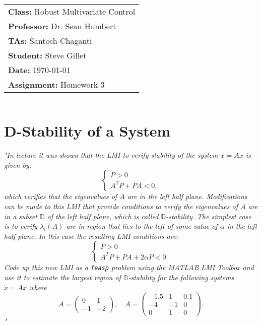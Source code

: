 \documentclass[12pt, letterpaper]{article}
\begin{document}
\title{
    \begin{tabular}{@{}l@{}}
        \textbf{Class:} Robust Multivariate Control \\
        \textbf{Professor:} Dr. Sean Humbert \\
        \textbf{TAs:} Santosh Chaganti \\
        \textbf{Student:} Steve Gillet \\
        \textbf{Date:} \today \\
        \textbf{Assignment:} Homework 3
    \end{tabular}
}

\author{}
\date{}

\maketitle

\section{D-Stability of a System}
\textit{
    "In lecture it was shown that the LMI to verify stability of the system $\dot{x} = Ax$ is given by:
}
\[
\begin{cases}
P > 0 \\
A^T P + P A < 0,
\end{cases}
\]
\textit{
    which verifies that the eigenvalues of $A$ are in the left half plane. Modifications can be made to this LMI that provide conditions to verify the eigenvalues of $A$ are in a subset $\mathbb{D}$ of the left half plane, which is called $\mathbb{D}$-stability. The simplest case is to verify $\lambda_i(A)$ are in region that lies to the left of some value of $\alpha$ in the left half plane. In this case the resulting LMI conditions are:
}
\[
\begin{cases}
P > 0 \\
A^T P + P A + 2\alpha P < 0.
\end{cases}
\]
\textit{
    Code up this new LMI as a \texttt{feasp} problem using the MATLAB LMI Toolbox and use it to estimate the largest region of $\mathbb{D}$-stability for the following systems $\dot{x} = Ax$ where
}
\[
A = \begin{pmatrix}
0 & 1 \\
-1 & -2
\end{pmatrix}, \quad
A = \begin{pmatrix}
-1.5 & 1 & 0.1 \\
-4 & -1 & 0 \\
0 & 1 & 0
\end{pmatrix}.
\]
\textit{"}
\end{document}
